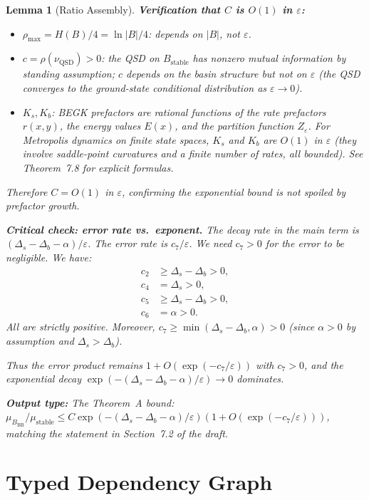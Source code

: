\documentclass[11pt]{article}
\newtheorem{lemma}{Lemma}
\newcommand{\eps}{\varepsilon}
\newcommand{\Ds}{\Delta_s}
\newcommand{\Db}{\Delta_b}
\newcommand{\Bstable}{B_{\mathrm{stable}}}
\newcommand{\BBB}{B_{\mathrm{BB}}}
\newcommand{\QSD}{\mathrm{QSD}}
\begin{document}
\begin{lemma}[Ratio Assembly]
\medskip
\textbf{Verification that $C$ is $O(1)$ in $\eps$:}
\begin{itemize}
\item $\rho_{\max} = H(B)/4 = \ln|B|/4$: depends on $|B|$, not $\eps$.
\item $c = \rho(\nu_\QSD) > 0$: the QSD on $\Bstable$ has nonzero
  mutual information by standing assumption; $c$ depends on the
  basin structure but not on $\eps$ (the QSD converges to the
  ground-state conditional distribution as $\eps \to 0$).
\item $K_s, K_b$: BEGK prefactors are rational functions of the
  rate prefactors $r(x,y)$, the energy values $E(x)$, and the
  partition function $Z_\eps$. For Metropolis dynamics on finite
  state spaces, $K_s$ and $K_b$ are $O(1)$ in $\eps$ (they involve
  saddle-point curvatures and a finite number of rates, all bounded).
  See \cite{BdH15} Theorem~7.8 for explicit formulas.
\end{itemize}
Therefore $C = O(1)$ in $\eps$, confirming the exponential bound
is not spoiled by prefactor growth.

\medskip
\textbf{Critical check: error rate vs.\ exponent.}
The decay rate in the main term is $(\Ds - \Db - \alpha)/\eps$.
The error rate is $c_7/\eps$. We need $c_7 > 0$ for the error to
be negligible. We have:
\begin{align*}
  c_2 &\geq \Ds - \Db > 0, \\
  c_4 &= \Ds > 0, \\
  c_5 &\geq \Ds - \Db > 0, \\
  c_6 &= \alpha > 0.
\end{align*}
All are strictly positive. Moreover,
$c_7 \geq \min(\Ds - \Db, \alpha) > 0$
(since $\alpha > 0$ by assumption and $\Ds > \Db$).

Thus the error product remains $1 + O(\exp(-c_7/\eps))$ with
$c_7 > 0$, and the exponential decay $\exp(-(\Ds - \Db - \alpha)/\eps)
\to 0$ dominates.

\medskip
\textbf{Output type:}
The Theorem~A bound:
$\mu_{\BBB} / \mu_{\mathrm{stable}} \leq C \exp(-(\Ds - \Db - \alpha)/\eps)
(1 + O(\exp(-c_7/\eps)))$,
matching the statement in Section~7.2 of the draft.
\end{lemma}

\section{Typed Dependency Graph}
\label{sec:dependency-graph}
\end{document}
